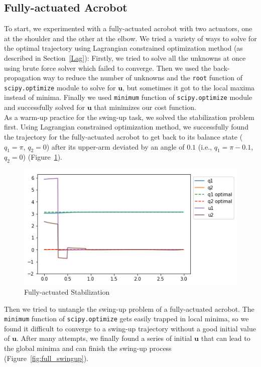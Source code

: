 \subsection{Fully-actuated Acrobot}
\quad To start, we experimented with a fully-actuated acrobot with two actuators, one at the shoulder and the other at the elbow. We tried a variety of ways to solve for the optimal trajectory using Lagrangian constrained optimization method  (as described in Section~\ref{Lag}): Firstly, we tried to solve all the unknowns at once using brute force solver which failed to converge. Then we used the back-propagation way to reduce the number of unknowns and the \texttt{root} function of \texttt{scipy.optimize} module to solve for $\mathbf u$, but sometimes it got to the local maxima instead of minima. Finally we used \texttt{minimum} function of \texttt{scipy.optimize} module and successfully solved for $\mathbf u$ that minimizes our cost function.\\
\null \quad As a warm-up practice for the swing-up task, we solved the stabilization problem first. Using Lagrangian constrained optimization method, we successfully found the trajectory for the fully-actuated acrobot to get back to its balance state ($q_1 = \pi$, $q_2 = 0$) after its upper-arm deviated by an angle of $0.1$ (i.e., $q_1= \pi - 0.1$, $q_2 = 0$) (Figure~\ref{fig:full_stablization}).
\begin{figure}[H]
\begin{center}
\includegraphics[width=0.8\linewidth]{full_stablization.png}
\caption[caption]{Fully-actuated Stabilization}
\label{fig:full_stablization}
\end{center}
\end{figure}

Then we tried to untangle the swing-up problem of a fully-actuated acrobot. The \texttt{minimum} function of \texttt{scipy.optimize} gets easily trapped in local minima, so we found it difficult to converge to a swing-up trajectory without a good initial value of $\mathbf u$. After many attempts, we finally found a series of initial $\mathbf u$ that can lead to the global minima and can finish the swing-up process (Figure~\ref{fig:full_swingup}).

